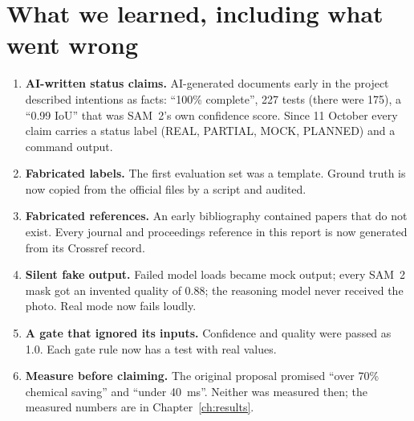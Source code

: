 \section{What we learned, including what went wrong}\label{sec:lessons}
\begin{enumerate}
\item \textbf{AI-written status claims.} AI-generated documents early in the project described
  intentions as facts: ``100\% complete'', 227 tests (there were 175), a ``0.99 IoU'' that was SAM~2's
  own confidence score. Since 11 October every claim carries a status label (REAL, PARTIAL, MOCK,
  PLANNED) and a command output.
\item \textbf{Fabricated labels.} The first evaluation set was a template. Ground truth is now copied
  from the official files by a script and audited.
\item \textbf{Fabricated references.} An early bibliography contained papers that do not exist. Every
  journal and proceedings reference in this report is now generated from its Crossref record.
\item \textbf{Silent fake output.} Failed model loads became mock output; every SAM~2 mask got an
  invented quality of 0.88; the reasoning model never received the photo. Real mode now fails loudly.
\item \textbf{A gate that ignored its inputs.} Confidence and quality were passed as 1.0. Each gate
  rule now has a test with real values.
\item \textbf{Measure before claiming.} The original proposal promised ``over 70\% chemical saving''
  and ``under 40~ms''. Neither was measured then; the measured numbers are in
  Chapter~\ref{ch:results}.
\end{enumerate}

